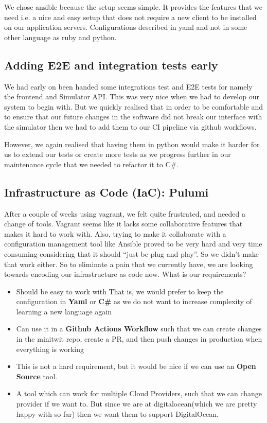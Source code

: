 We chose ansible because the setup seems simple. It provides the features that we need i.e. a nice and easy setup that does not require a new client to be installed on our application servers. Configurations described in yaml and not in some other language as ruby and python. 

\subsection{Adding E2E and integration tests early}

We had early on been handed some integrations test and E2E tests for namely the frontend and Simulator API. This was very nice when we had to develop our system to begin with. But we quickly realised that in order to be comfortable and to ensure that our future changes in the software did not break our interface with the simulator then we had to add them to our CI pipeline via github workflows.

However, we again realised that having them in python would make it harder for us to extend our tests or create more tests as we progress further in our maintenance cycle that we needed to refactor it to C\#.

\subsection{Infrastructure as Code (IaC): Pulumi}

After a couple of weeks using vagrant, we felt quite frustrated, and needed a change of tools. Vagrant seems like it lacks some collaborative features that makes it hard to work with. Also, trying to make it collaborate with a configuration management tool like Ansible proved to be very hard and very time consuming considering that it should “just be plug and play”. So we didn’t make that work either. So to eliminate a pain that we currently have, we are looking towards encoding our infrastructure as code now. What is our requirements?

\begin{itemize}
    \item Should be easy to work with
        \subitem That is, we would prefer to keep the configuration in \textbf{Yaml} or \textbf{C\#} as we do not want to increase complexity of learning a new language again
    \item Can use it in a \textbf{Github Actions Workflow} such that we can create changes in the minitwit repo, create a PR, and then push changes in production when everything is working
    \item This is not a hard requirement, but it would be nice if we can use an \textbf{Open Source} tool.
    \item A tool which can work for multiple Cloud Providers, such that we can change provider if we want to. But since we are at digitalocean(which we are pretty happy with so far) then we want them to support DigitalOcean.
\end{itemize}

